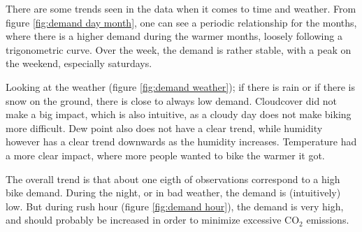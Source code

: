 There are some trends seen in the data when it comes to time and weather. From figure \ref{fig:demand day month}, one can see a periodic relationship for the months, where there is a higher demand during the warmer months, loosely following a trigonometric curve. Over the week, the demand is rather stable, with a peak on the weekend, especially saturdays. 

Looking at the weather (figure \ref{fig:demand weather}); if there is rain or if there is snow on the ground, there is close to always low demand. Cloudcover did not make a big impact, which is also intuitive, as a cloudy day does not make biking more difficult. Dew point also does not have a clear trend, while humidity however has a clear trend downwards as the humidity increases. Temperature had a more clear impact, where more people wanted to bike the warmer it got.

The overall trend is that about one eigth of observations correspond to a high bike demand. During the night, or in bad weather, the demand is (intuitively) low. But during rush hour (figure \ref{fig:demand hour}), the demand is very high, and should probably be increased in order to minimize excessive CO$_2$ emissions.